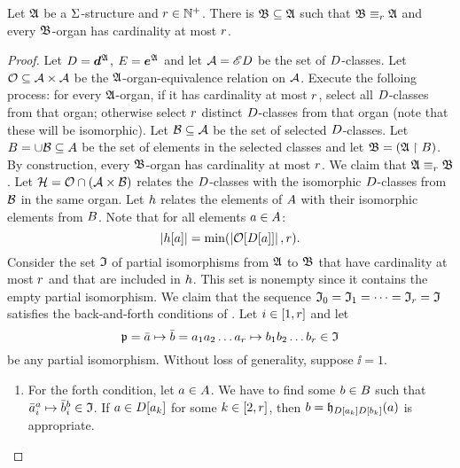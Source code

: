 \begin{lemma}\label{lem:monadic-organ}
Let $\mathfrak{A}$ be a $\mathrm{\Sigma}$-structure and $r \in \mathbb{N}^{+}$.
There is $\mathfrak{B} \subseteq \mathfrak{A}$ such that $\mathfrak{B} \equiv_{r} \mathfrak{A}$ and every
$\mathfrak{B}$-organ has cardinality at most $r$.
\end{lemma}
\begin{proof}
Let $D = \bm{d}^{\mathfrak{A}}$, $E = \bm{e}^{\mathfrak{A}}$ and
let $\mathcal{A} = {\mathscr{E}D}$ be the set of $D$-classes.
Let $\mathcal{O} \subseteq {\mathcal{A}\times\mathcal{A}}$ be the $\mathfrak{A}$-organ-equivalence relation
on $\mathcal{A}$.
Execute the folloing process: for every $\mathfrak{A}$-organ, if it has cardinality at
most $r$, select all $D$-classes from that organ; otherwise select $r$
distinct $D$-classes from that organ (note that these will be isomorphic).
Let $\mathcal{B} \subseteq \mathcal{A}$ be the set of selected $D$-classes.
Let $B = \cup \mathcal{B} \subseteq A$ be the set of elements in the selected
classes and let $\mathfrak{B} = (\mathfrak{A} \restriction B)$.
By construction, every $\mathfrak{B}$-organ has cardinality at most $r$.
We claim that $\mathfrak{A} \equiv_{r} \mathfrak{B}$.
Let $\mathcal{H} = \mathcal{O} \cap (\mathcal{A}\times\mathcal{B})$ relates the $D$-classes with the
isomorphic $D$-classes from $\mathcal{B}$ in the same organ.
Let $h$ relates the elements of $A$ with their isomorphic elements from
$B$.
Note that for all elements $a \in A$:
\begin{equation}\label{eq:monadic-organ}
  \left|h[a]\right| = \min(\left|\mathcal{O}[D[a]]\right|, r).
\end{equation}
Consider the set $\mathfrak{I}$ of partial isomorphisms from $\mathfrak{A}$ to $\mathfrak{B}$ that
have cardinality at most $r$ and that are included in $h$. This set is
nonempty since it contains the empty partial isomorphism.
We claim that the sequence $\mathfrak{I}_{0} = \mathfrak{I}_{1} = \dots = \mathfrak{I}_{r} = \mathfrak{I}$
satisfies the back-and-forth conditions of .
Let $i \in [1,r]$ and let 
\[
  \mathfrak{p} = \bar{a} \mapsto \bar{b} =
  a_{1}a_{2}\dots a_{r} \mapsto b_{1}b_{2}\dots b_{r} \in \mathfrak{I}
\]
be any partial isomorphism.
Without loss of generality, suppose $\ii = 1$.
\begin{enumerate}
  \item For the forth condition, let $a \in A$. We have to find some $b
  \in B$ such that
  $\bar{a}_{i}^{a} \mapsto \bar{b}_{i}^{b} \in \mathfrak{I}$.
  If $a \in D[a_{k}]$ for some $k \in [2,r]$,
  then $b = \mathfrak{h}_{D[a_{k}]D[b_{k}]}(a)$ is appropriate.
  

\end{enumerate}
\end{proof}
